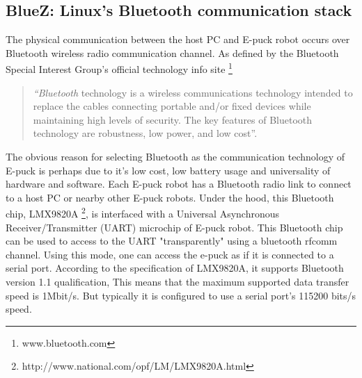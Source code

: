 \subsection{BlueZ: Linux's Bluetooth communication stack}
\label{expt-tools:bluez}
The physical communication between the host PC and E-puck robot occurs over Bluetooth wireless radio communication channel.  As defined by the Bluetooth Special Interest Group's official technology  info site \footnote{www.bluetooth.com}
 \begin{quote}
{\em ``Bluetooth} technology is a wireless communications technology intended to replace the cables connecting portable and/or fixed devices while maintaining high levels of security. The key features of Bluetooth technology are robustness, low power, and low cost''.
 \end{quote}
The obvious reason for selecting Bluetooth as the communication technology of E-puck is perhaps   due to it's low cost, low battery usage and universality of hardware and software. Each E-puck robot has a Bluetooth radio link to connect to a host PC or nearby other E-puck robots. Under the hood,  this Bluetooth  chip, LMX9820A \footnote{http://www.national.com/opf/LM/LMX9820A.html},   is  interfaced with a Universal Asynchronous Receiver/Transmitter (UART)  microchip of E-puck robot. This Bluetooth chip can be used to access to the UART "transparently" using a bluetooth rfcomm channel. Using this mode, one can access the e-puck as if it is connected to a serial port.  According to the specification of LMX9820A, it supports Bluetooth version 1.1 qualification, This means that the maximum supported data transfer speed is 1Mbit/s. But typically it is configured to use a serial port's 115200 bits/s speed.\\ 
